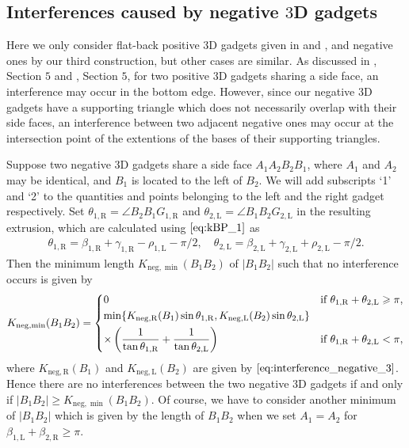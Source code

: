 \documentclass[11pt]{amsart}
\numberwithin{equation}{section}
\numberwithin{theorem}{section}
\newcommand{\Lt}{\ensuremath{\mathrm{L}}}
\newcommand{\Rt}{\ensuremath{\mathrm{R}}}
\newcommand{\norm}[1]{\ensuremath{\left| #1 \right|}}
\newcommand{\nega}{\ensuremath{\mathrm{neg}}}
\begin{document}
\subsection{Interferences caused by negative $3$D gadgets}\label{subsec:interferences}
Here we only consider flat-back positive $3$D gadgets given in \cite{Doi19} and \cite{Doi20}, and negative ones by our third construction,
but other cases are similar.
As discussed in \cite{Doi19}, Section $5$ and \cite{Doi20}, Section $5$, for two positive $3$D gadgets sharing a side face,
an interference may occur in the bottom edge.
However, since our negative $3$D gadgets have a supporting triangle which does not necessarily overlap with their side faces,
an interference between two adjacent negative ones may occur at the intersection point of the extentions of the bases of their supporting triangles.

Suppose two negative $3$D gadgets share a side face $A_1 A_2 B_2 B_1$, where $A_1$ and $A_2$ may be identical, and $B_1$ is located to the left of $B_2$.
We will add subscripts `1' and `2' to the quantities and points belonging to the left and the right gadget respectively.
Set $\theta_{1,\Rt}=\angle B_2 B_1 G_{1,\Rt}$ and $\theta_{2,\Lt}=\angle B_1 B_2 G_{2,\Lt}$ in the resulting extrusion,
which are calculated using $\eqref{eq:kBP_1}$ as
\begin{align*}
\theta_{1,\Rt}=\beta_{1,\Rt}+\gamma_{1,\Rt}-\rho_{1,\Lt}-\pi /2,\quad\theta_{2,\Lt}=\beta_{2,\Lt}+\gamma_{2,\Lt}+\rho_{2,\Lt}-\pi /2.
\end{align*}
Then the minimum length $K_{\nega ,\min}(B_1 B_2)$ of $\norm{B_1 B_2}$ such that no interference occurs is given by
\begin{align*}
K_{\nega ,\min}(B_1 B_2)=
\begin{dcases}
0&\text{if }\theta_{1,\Rt}+\theta_{2,\Lt}\geqslant\pi ,\\
\min\{K_{\nega ,\Rt}(B_1)\sin\theta_{1,\Rt},K_{\nega ,\Lt}(B_2)\sin\theta_{2,\Lt}\}&\\
\times\left(\frac{1}{\tan\theta_{1,\Rt}}+\frac{1}{\tan\theta_{2,\Lt}}\right)&\text{if }\theta_{1,\Rt}+\theta_{2,\Lt}<\pi ,
\end{dcases}
\end{align*}
where $K_{\nega ,\Rt}(B_1)$ and $K_{\nega ,\Lt}(B_2)$ are given by $\eqref{eq:interference_negative_3}$.
Hence there are no interferences between the two negative $3$D gadgets if and only if $\norm{B_1 B_2}\geqslant K_{\nega ,\min}(B_1 B_2)$.
Of course, we have to consider another minimum of $\norm{B_1 B_2}$ which is given by the length of $B_1 B_2$
when we set $A_1=A_2$ for $\beta_{1,\Lt}+\beta_{2,\Rt}\geqslant\pi$.
\end{document}
